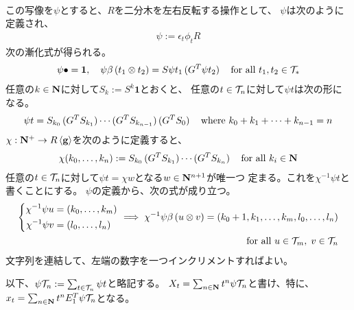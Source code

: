 {\begin{equation}
\begin{split}
	\end{split}\end{equation}
	この写像を$\psi$とすると、$R$を二分木を左右反転する操作として、
	$\psi$は次のように定義され、
	\begin{equation*}\begin{split}
		\psi := \epsilon_t\phi_tR
	\end{split}\end{equation*}
	次の漸化式が得られる。
	\begin{equation*}\begin{split}
		\psi\bullet = \mathbf{1},\quad 
		\psi\beta\mathinner{({t_1\otimes t_2})} = S\psi t_1\mathinner{({G^T\psi t_2})}
		\quad\text{for all } t_1,t_2\in\mathcal{T}_*
	\end{split}\end{equation*}
	任意の$k\in\mathbf{N}$に対して$S_k:=S^k\mathbf{1}$とおくと、
	任意の$t\in{\mathcal{T}}_n$に対して$\psi t$は次の形になる。
	\begin{equation*}\begin{split}
		\psi t = S_{k_0}\mathinner{({G^TS_{k_1}})}\cdots\mathinner{({G^TS_{k_{n-1}}})}\mathinner{({G^TS_0})}
		\quad\text{where } k_0 + k_1 +\cdots+ k_{n-1} = n
	\end{split}\end{equation*}
	$\chi:\mathbf{N}^+\to R\mathinner{\langle{\mathbf{g}}\rangle}$を次のように定義すると、
	\begin{equation*}\begin{split}
		\chi(k_0,\dots,k_n) := S_{k_0}\mathinner{({G^TS_{k_1}})}\cdots\mathinner{({G^TS_{k_n}})}
		\quad\text{for all } k_i\in\mathbf{N}
	\end{split}\end{equation*}
	任意の$t\in{\mathcal{T}}_n$に対して$\psi t=\chi w$となる$w\in\mathbf{N}^{n+1}$が唯一つ
	定まる。これを$\chi^{-1}\psi t$と書くことにする。
	$\psi$の定義から、次の式が成り立つ。
	\begin{equation*}\begin{split}
		\left\{\begin{split}
			\chi^{-1}\psi u &= (k_0,\dots,k_m) \\
			\chi^{-1}\psi v &= (l_0,\dots,l_n)
		\end{split}\right.\implies \chi^{-1}\psi\beta\mathinner{({u\otimes v})} 
		= (k_0+1,k_1,\dots,k_m,l_0,\dots,l_n) \\
		\quad\text{for all } u\in{\mathcal{T}}_m,\; v\in{\mathcal{T}}_n
	\end{split}\end{equation*}
	文字列を連結して、左端の数字を一つインクリメントすればよい。

	以下、$\psi{\mathcal{T}}_n := \sum_{t\in{\mathcal{T}}_n}\psi t$と略記する。
	$X_t = \sum_{n\in\mathbf{N}}t^n\psi{\mathcal{T}}_n$と書け、特に、
	$x_t = \sum_{n\in\mathbf{N}}t^n E_1^T\psi{\mathcal{T}}_n$となる。

}
